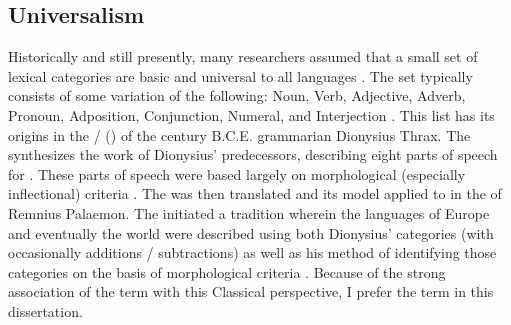 \subsection{Universalism}
\label{sec:2.2.1}

Historically and still presently, many researchers assumed that a small set of lexical categories are basic and universal to all languages \parencites[81]{BolingerSears1981}[2]{Croft1991}[32]{Payne1997}[95]{Stassen2011}. The set typically consists of some variation of the following: Noun, Verb, Adjective, Adverb, Pronoun, Adposition, Conjunction, Numeral, and Interjection \parencite[16538]{Haspelmath2001}. This list has its origins in the  /  () of the  century B.C.E. grammarian Dionysius Thrax. The  synthesizes the work of Dionysius' predecessors, describing eight parts of speech for . These parts of speech were based largely on morphological (especially inflectional) criteria \parencite[17--20]{Rauh2010}. The  was then translated and its model applied to  in the  of Remnius Palaemon. The  initiated a tradition wherein the languages of Europe and eventually the world  were described using both Dionysius' categories (with occasionally additions / subtractions) as well as his method of identifying those categories on the basis of morphological criteria \parencite[20]{Rauh2010}. Because of the strong association of the term  with this Classical perspective, I prefer the term  in this dissertation.

